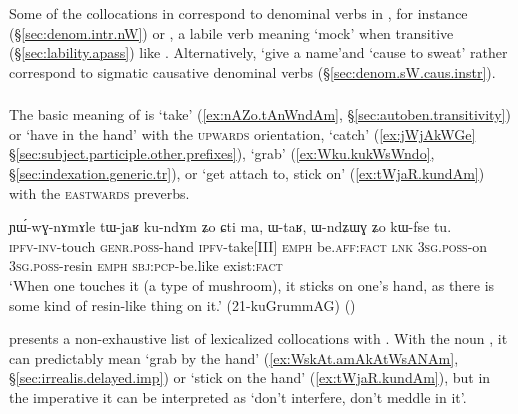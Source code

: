 Some of the collocations in  correspond to denominal verbs in , for instance  (§\ref{sec:denom.intr.nW}) or , a labile verb meaning `mock' when transitive (§\ref{sec:lability.apass}) like . Alternatively,  `give a name'and  `cause to sweat' rather correspond to sigmatic causative denominal verbs (§\ref{sec:denom.sW.caus.instr}).


\subsubsection{ } \label{sec:ndo.lv}
The basic meaning of  is `take' (\ref{ex:nAZo.tAnWndAm}, §\ref{sec:autoben.transitivity}) or `have in the hand' with the \textsc{upwards} orientation, `catch' (\ref{ex:jWjAkWGe} §\ref{sec:subject.participle.other.prefixes}), `grab' (\ref{ex:Wku.kukWsWndo}, §\ref{sec:indexation.generic.tr}), or  `get attach to, stick on' (\ref{ex:tWjaR.kundAm}) with the \textsc{eastwards} preverbs.  
  
\begin{exe}
\ex \label{ex:tWjaR.kundAm}
\gll ɲɯ́-wɣ-nɤmɤle tɯ-jaʁ ku-ndɤm ʑo ɕti ma, ɯ-taʁ, ɯ-ndʑɯɣ ʑo kɯ-fse tu. \\
\textsc{ipfv}-\textsc{inv}-touch \textsc{genr}.\textsc{poss}-hand \textsc{ipfv}-take[III] \textsc{emph} be.\textsc{aff}:\textsc{fact} \textsc{lnk} \textsc{3sg}.\textsc{poss}-on \textsc{3sg}.\textsc{poss}-resin \textsc{emph} \textsc{sbj}:\textsc{pcp}-be.like exist:\textsc{fact} \\
\glt `When one touches it (a type of mushroom), it sticks on one's hand, as there is some kind of resin-like thing on it.' (21-kuGrummAG)
()
\end{exe}

 presents a non-exhaustive list of lexicalized collocations with . With the noun , it can predictably mean `grab by the hand' (\ref{ex:WskAt.amAkAtWsANAm}, §\ref{sec:irrealis.delayed.imp}) or `stick on the hand' (\ref{ex:tWjaR.kundAm}), but in the imperative it can be interpreted as `don't interfere, don't meddle in it'.

